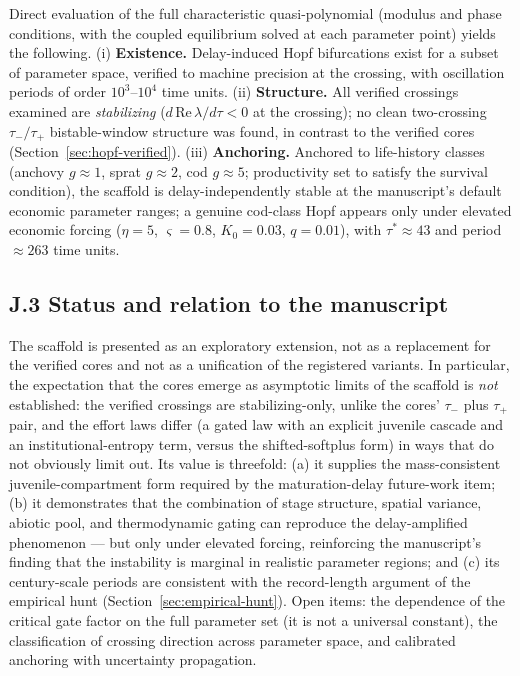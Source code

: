 \documentclass[twocolumn,10pt]{article}
\begin{document}
Direct evaluation of the full characteristic quasi-polynomial (modulus and phase conditions, with the coupled equilibrium solved at each parameter point) yields the following. (i) \textbf{Existence.} Delay-induced Hopf bifurcations exist for a subset of parameter space, verified to machine precision at the crossing, with oscillation periods of order $10^3$--$10^4$ time units. (ii) \textbf{Structure.} All verified crossings examined are \emph{stabilizing} ($d\,\mathrm{Re}\,\lambda/d\tau<0$ at the crossing); no clean two-crossing $\tau_-/\tau_+$ bistable-window structure was found, in contrast to the verified cores (Section~\ref{sec:hopf-verified}). (iii) \textbf{Anchoring.} Anchored to life-history classes (anchovy $g\approx1$, sprat $g\approx2$, cod $g\approx5$; productivity set to satisfy the survival condition), the scaffold is delay-independently stable at the manuscript's default economic parameter ranges; a genuine cod-class Hopf appears only under elevated economic forcing ($\eta=5$, $\varsigma=0.8$, $K_0=0.03$, $q=0.01$), with $\tau^*\approx43$ and period $\approx263$ time units.

\subsection{J.3 Status and relation to the manuscript}

The scaffold is presented as an exploratory extension, not as a replacement for the verified cores and not as a unification of the registered variants. In particular, the expectation that the cores emerge as asymptotic limits of the scaffold is \emph{not} established: the verified crossings are stabilizing-only, unlike the cores' $\tau_-$ plus $\tau_+$ pair, and the effort laws differ (a gated law with an explicit juvenile cascade and an institutional-entropy term, versus the shifted-softplus form) in ways that do not obviously limit out. Its value is threefold: (a) it supplies the mass-consistent juvenile-compartment form required by the maturation-delay future-work item; (b) it demonstrates that the combination of stage structure, spatial variance, abiotic pool, and thermodynamic gating can reproduce the delay-amplified phenomenon --- but only under elevated forcing, reinforcing the manuscript's finding that the instability is marginal in realistic parameter regions; and (c) its century-scale periods are consistent with the record-length argument of the empirical hunt (Section~\ref{sec:empirical-hunt}). Open items: the dependence of the critical gate factor on the full parameter set (it is not a universal constant), the classification of crossing direction across parameter space, and calibrated anchoring with uncertainty propagation.
\end{document}
